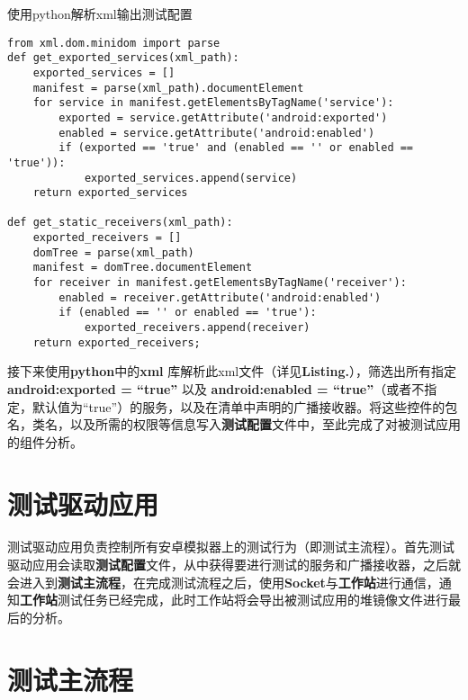\begin{listing}[htbp]
	\centering
	\caption{使用python解析xml输出测试配置}
	\begin{verbatim}
from xml.dom.minidom import parse
def get_exported_services(xml_path):
	exported_services = []
	manifest = parse(xml_path).documentElement 
	for service in manifest.getElementsByTagName('service'):
		exported = service.getAttribute('android:exported')
		enabled = service.getAttribute('android:enabled')
		if (exported == 'true' and (enabled == '' or enabled == 'true')):
			exported_services.append(service)
	return exported_services
	
def get_static_receivers(xml_path):
	exported_receivers = []
	domTree = parse(xml_path)
	manifest = domTree.documentElement
	for receiver in manifest.getElementsByTagName('receiver'):
		enabled = receiver.getAttribute('android:enabled')
		if (enabled == '' or enabled == 'true'):
			exported_receivers.append(receiver)
	return exported_receivers;
	\end{verbatim}
	\label{python:get services}	
\end{listing}

接下来使用\textbf{python}中的\textbf{xml} 库解析此xml文件（详见\textbf{Listing.}\redbf{\ref{python:get services}}），筛选出所有指定\textbf{android:exported = “true”} 以及 \textbf{android:enabled = “true”}（或者不指定，默认值为“true”）的服务，以及在清单中声明的广播接收器。将这些控件的包名，类名，以及所需的权限等信息写入\textbf{测试配置}文件中，至此完成了对被测试应用的组件分析。
\section{测试驱动应用}\label{test driver app}
测试驱动应用负责控制所有安卓模拟器上的测试行为（即测试主流程\redbf{\ref{main flow}}）。首先测试驱动应用会读取\textbf{测试配置}文件，从中获得要进行测试的服务和广播接收器，之后就会进入到\textbf{测试主流程}，在完成测试流程之后，使用\textbf{Socket}与\textbf{工作站}进行通信，通知\textbf{工作站}测试任务已经完成，此时工作站将会导出被测试应用的堆镜像文件进行最后的分析。
\section{测试主流程}\label{main flow}

